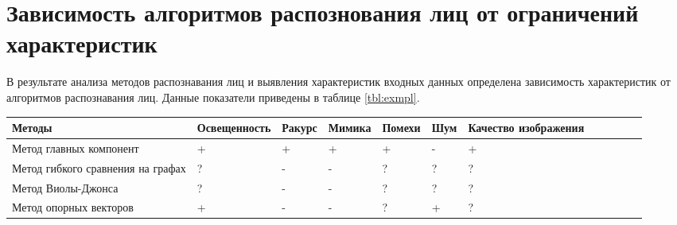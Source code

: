 \chapter{Зависимость алгоритмов распознования лиц от ограничений характеристик}

В результате анализа методов распознавания лиц и выявления характеристик 
входных данных определена зависимость характеристик от алгоритмов 
распознавания лиц. Данные показатели приведены в таблице \ref{tbl:exmpl}.

\begin{table}[!ht]
    \centering
    \begin{tabular}{|l|l|l|l|l|l|l|l|l|l|}
    \hline
        Методы & Освещенность & Ракурс & Мимика & Помехи & Шум  & Качество изображения & ~ & ~ & ~ \\ \hline
        Метод главных компонент & + & + & + & + & - & + & ~ & ~ & ~ \\ \hline
        Метод гибкого сравнения на графах & ? & - & - & ? & ? & ? & ~ & ~ & ~ \\ \hline
        Метод Виолы-Джонса & ? & - & - & ? & ? & ? & ~ & ~ & ~ \\ \hline
        Метод опорных векторов & + & - & - & ? & + & ? & ~ & ~ & ~ \\ \hline
    \end{tabular}
\end{table}

